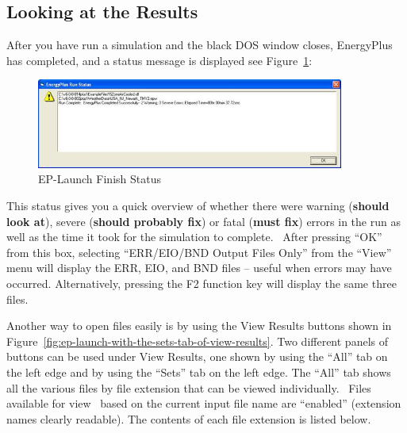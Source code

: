 \subsection{Looking at the Results}\label{looking-at-the-results}

After you have run a simulation and the black DOS window closes, EnergyPlus has completed, and a status message is displayed see Figure~\ref{fig:ep-launch-finish-status}:

\begin{figure}[hbtp] %
\centering
\includegraphics[width=0.9\textwidth, height=0.9\textheight, keepaspectratio=true]{media/image005.jpg}
\caption{EP-Launch Finish Status \protect \label{fig:ep-launch-finish-status}}
\end{figure}

This status gives you a quick overview of whether there were warning (\textbf{should look at}), severe (\textbf{should probably fix}) or fatal (\textbf{must fix}) errors in the run as well as the time it took for the simulation to complete.~ After pressing ``OK'' from this box, selecting ``ERR/EIO/BND Output Files Only'' from the ``View'' menu will display the ERR, EIO, and BND files -- useful when errors may have occurred. Alternatively, pressing the F2 function key will display the same three files.

Another way to open files easily is by using the View Results buttons shown in Figure~\ref{fig:ep-launch-with-the-sets-tab-of-view-results}. Two different panels of buttons can be used under View Results, one shown by using the ``All'' tab on the left edge and by using the ``Sets'' tab on the left edge. The ``All'' tab shows all the various files by file extension that can be viewed individually.~ Files available for view~ based on the current input file name are ``enabled'' (extension names clearly readable). The contents of each file extension is listed below.

